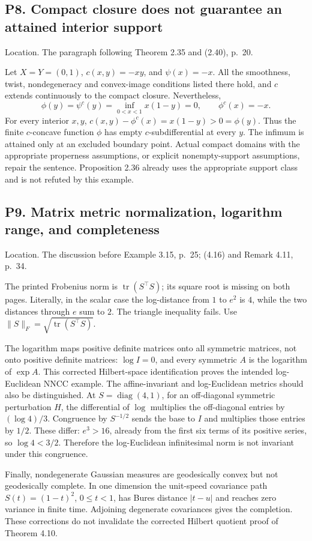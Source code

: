 \documentclass[10pt]{article}
\begin{document}
\subsection*{P8. Compact closure does not guarantee an attained interior support}
Location. The paragraph following Theorem 2.35 and (2.40), p. 20.\par
Let \(X=Y=(0,1)\), \(c(x,y)=-xy\), and \(\psi(x)=-x\). All the smoothness, twist, nondegeneracy and convex-image conditions listed there hold, and \(c\) extends continuously to the compact closure. Nevertheless, \[\phi(y)=\psi^c(y)=\inf_{0<x<1}x(1-y)=0,\qquad
 \phi^c(x)=-x.\] For every interior \(x,y\), \(c(x,y)-\phi^c(x)=x(1-y)>0=\phi(y)\). Thus the finite \(c\)-concave function \(\phi\) has empty \(c\)-subdifferential at every \(y\). The infimum is attained only at an excluded boundary point. Actual compact domains with the appropriate properness assumptions, or explicit nonempty-support assumptions, repair the sentence. Proposition 2.36 already uses the appropriate support class and is not refuted by this example.\par
\subsection*{P9. Matrix metric normalization, logarithm range, and completeness}
Location. The discussion before Example 3.15, p. 25; (4.16) and Remark 4.11, p. 34.\par
The printed Frobenius norm is \(\operatorname{tr}(S^\top S)\); its square root is missing on both pages. Literally, in the scalar case the log-distance from \(1\) to \(e^2\) is \(4\), while the two distances through \(e\) sum to \(2\). The triangle inequality fails. Use \(\|S\|_F=\sqrt{\operatorname{tr}(S^\top S)}\).\par
The logarithm maps positive definite matrices onto all symmetric matrices, not onto positive definite matrices: \(\log I=0\), and every symmetric \(A\) is the logarithm of \(\exp A\). This corrected Hilbert-space identification proves the intended log-Euclidean NNCC example. The affine-invariant and log-Euclidean metrics should also be distinguished. At \(S=\operatorname{diag}(4,1)\), for an off-diagonal symmetric perturbation \(H\), the differential of \(\log\) multiplies the off-diagonal entries by \((\log4)/3\). Congruence by \(S^{-1/2}\) sends the base to \(I\) and multiplies those entries by \(1/2\). These differ: \(e^3>16\), already from the first six terms of its positive series, so \(\log4<3/2\). Therefore the log-Euclidean infinitesimal norm is not invariant under this congruence.\par
Finally, nondegenerate Gaussian measures are geodesically convex but not geodesically complete. In one dimension the unit-speed covariance path \(S(t)=(1-t)^2\), \(0\le t<1\), has Bures distance \(|t-u|\) and reaches zero variance in finite time. Adjoining degenerate covariances gives the completion. These corrections do not invalidate the corrected Hilbert quotient proof of Theorem 4.10.\par
\end{document}
